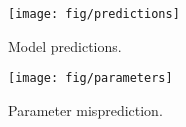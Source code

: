 \begin{figure}
 \texttt{[image: fig/predictions]}
 \caption{Model predictions.}
\end{figure}

\begin{figure}
 \texttt{[image: fig/parameters]}\\
 \caption{Parameter misprediction.}
\end{figure}
